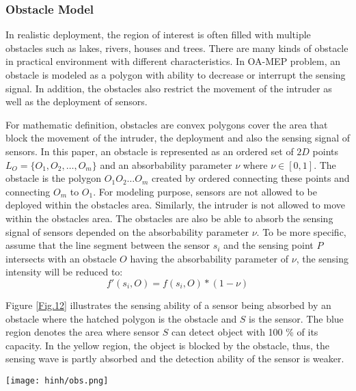 \documentclass[final]{elsarticle}
\begin{document}
\subsubsection{Obstacle Model}
In realistic deployment, the region of interest is often filled with multiple obstacles such as lakes, rivers, houses and trees. There are many kinds of obstacle in practical environment with different characteristics. In OA-MEP problem, an obstacle is modeled as a polygon with ability to decrease or interrupt the sensing signal. In addition, the obstacles also restrict the movement of the intruder as well as the deployment of sensors. 

For mathematic definition, obstacles are convex polygons cover the area that block the movement of the intruder, the deployment and also the sensing signal of sensors. In this paper, an obstacle is represented as an ordered set of $2D$ points $ L_O = \{O_1, O_2,\ldots,O_m\}$ and an absorbability parameter $\nu$ where $\nu \in [0,1]$. The obstacle is the polygon $O_1 O_2\ldots O_m $ created by ordered connecting these points and connecting $O_m$ to $O_1$. For modeling purpose, sensors are not allowed to be deployed within the obstacles area. Similarly, the intruder is not allowed to move within the obstacles area. The obstacles are also be able to absorb the sensing signal of sensors depended on the absorbability parameter $\nu$. To be more specific, assume that the line segment between the sensor $s_i$ and the sensing point $ P $ intersects with an obstacle $O$ having the absorbability parameter of $\nu$, the sensing intensity will be reduced to: 
\begin{equation}
\label{eqob}
f'(s_i,O) = f(s_i,O) * (1-\nu) 
\end{equation}

Figure \ref{Fig.12} illustrates the sensing ability of a sensor being absorbed by an obstacle where the hatched polygon is the obstacle and $ S $  is the sensor. The blue region denotes the area where sensor $ S $ can detect object with 100 \% of its capacity. In the yellow region, the object is blocked by the obstacle, thus, the sensing wave is partly absorbed and the detection ability of the sensor is weaker.
\begin{figure*}[h]
	\centering
	\texttt{[image: hinh/obs.png]}
	\caption{Sensing ability of a sensor being absorbed by an obstacle}
	\label{Fig.12}       %
\end{figure*}
\end{document}
